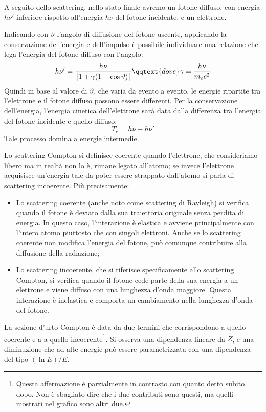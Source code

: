 A seguito dello scattering, nello stato finale avremo un fotone diffuso, con energia $h\nu'$ inferiore rispetto all'energia $h\nu$ del fotone incidente, e un elettrone.

Indicando con $\vartheta$ l'angolo di diffusione del fotone uscente, applicando la conservazione dell'energia e dell'impulso è possibile individuare una relazione che lega l'energia del fotone diffuso con l'angolo:
\begin{equation*}
    h\nu'=\frac{h\nu}{\big[1 + \gamma (1 - \cos{\vartheta})\big]}
    \qqtext{dove}
    \gamma=\frac{h\nu}{m_ec^2}
\end{equation*}
Quindi in base al valore di $\vartheta$, che varia da evento a evento, le energie ripartite tra l'elettrone e il fotone diffuso possono essere differenti.
Per la conservazione dell'energia, l'energia cinetica dell'elettrone sarà data dalla differenza tra l'energia del fotone incidente e quello diffuso:
\begin{equation*}
    T_e=h\nu - h\nu'
\end{equation*}
Tale processo domina a energie intermedie.

Lo scattering Compton si definisce coerente quando l'elettrone, che consideriamo libero ma in realtà non lo è, rimane legato all'atomo; se invece l'elettrone acquisisce un'energia tale da poter essere strappato dall'atomo si parla di scattering incoerente. Più precisamente:

\begin{itemize}[leftmargin=0.5cm]
    \item Lo scattering coerente (anche noto come scattering di Rayleigh) si verifica quando il fotone è deviato dalla sua traiettoria originale senza perdita di energia. In questo caso, l'interazione è elastica e avviene principalmente con l'intero atomo piuttosto che con singoli elettroni. Anche se lo scattering coerente non modifica l'energia del fotone, può comunque contribuire alla diffusione della radiazione;
    \item Lo scattering incoerente, che si riferisce specificamente allo scattering Compton, si verifica quando il fotone cede parte della sua energia a un elettrone e viene diffuso con una lunghezza d'onda maggiore. Questa interazione è inelastica e comporta un cambiamento nella lunghezza d'onda del fotone.
\end{itemize}

La sezione d'urto Compton è data da due termini che corrispondono a quello coerente e a a quello incoerente\footnote{Questa affermazione è parzialmente in contrasto con quanto detto subito dopo. Non è sbagliato dire che i due contributi sono questi, ma quelli mostrati nel grafico sono altri due.}. Si osserva una dipendenza lineare da $Z$, e una diminuzione che ad alte energie può essere parametrizzata con una dipendenza del tipo $(\ln E)/E$.

